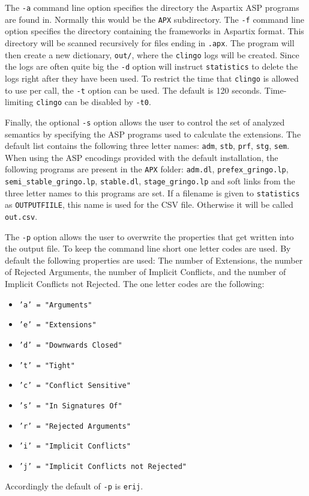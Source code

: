 \documentclass[parskip=half]{scrartcl}
\begin{document}
The \texttt{-a} command line option specifies the directory the Aspartix ASP
programs are found in. Normally this would be the \texttt{APX\/} subdirectory.
The \texttt{-f} command line option specifies the directory containing the
frameworks in Aspartix format.  This directory will be scanned recursively for
files ending in \texttt{.apx}. The program will then create a new dictionary,
\texttt{out/}, where the \texttt{clingo} logs will be created.  Since the logs
are often quite big the \texttt{-d} option will instruct \texttt{statistics} to
delete the logs right after they have been used.  To restrict the time that
\texttt{clingo} is allowed to use per call, the \texttt{-t} option can be used.
The default is 120 seconds. Time-limiting \texttt{clingo} can be disabled by
\texttt{-t0}.

Finally, the optional \texttt{-s} option allows the user to control the set of
analyzed semantics by specifying the ASP programs used to calculate the
extensions.  The default list contains the following three letter names:
\texttt{adm}, \texttt{stb}, \texttt{prf}, \texttt{stg}, \texttt{sem}.  When
using the ASP encodings provided with the default installation, the following
programs are present in the \texttt{APX\/} folder: \texttt{adm.dl},
\texttt{prefex\_gringo.lp}, \texttt{semi\_stable\_gringo.lp},
\texttt{stable.dl}, \texttt{stage\_gringo.lp} and soft links from the three
letter names to this programs are set.  If a filename is given to
\texttt{statistics} as \texttt{OUTPUTFIILE}, this name is used for the CSV file.
Otherwise it will be called \texttt{out.csv}.

The \texttt{-p} option allows the user to overwrite the properties that get
written into the output file. To keep the command line short one letter codes
are used.  By default the following properties are used: The number of
Extensions, the number of Rejected Arguments, the number of Implicit Conflicts,
and the number of Implicit Conflicts not Rejected.  The one letter codes are the
following:
\begin{itemize}
	\item \texttt{'a' = "Arguments"}
	\item \texttt{'e' = "Extensions"}
	\item \texttt{'d' = "Downwards Closed"}
	\item \texttt{'t' = "Tight"}
	\item \texttt{'c' = "Conflict Sensitive"}
	\item \texttt{'s' = "In Signatures Of"}
	\item \texttt{'r' = "Rejected Arguments"}
	\item \texttt{'i' = "Implicit Conflicts"}
	\item \texttt{'j' = "Implicit Conflicts not Rejected"}
\end{itemize}
Accordingly the default of \texttt{-p} is \texttt{erij}.
\end{document}
